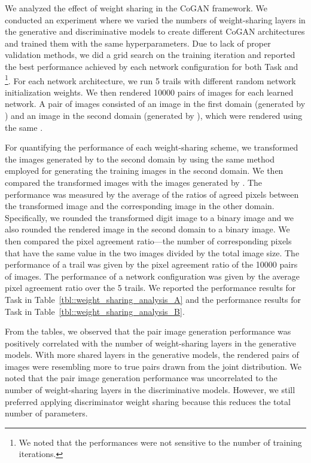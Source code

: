 \documentclass{article}
\begin{document}
We analyzed the effect of weight sharing in the CoGAN framework. We conducted an experiment where we varied the numbers of weight-sharing layers in the generative and discriminative models to create different CoGAN architectures and trained them with the same hyperparameters. Due to lack of proper validation methods, we did a grid search on the training iteration and reported the best performance achieved by each network configuration for both Task  and \footnote{We noted that the performances were not sensitive to the number of training iterations.}. For each network architecture, we run 5 trails with different random network initialization weights. We then rendered 10000 pairs of images for each learned network. A pair of images consisted of an image in the first domain (generated by ) and an image in the second domain (generated by ), which were rendered using the same . 

For quantifying the performance of each weight-sharing scheme, we transformed the images generated by  to the second domain by using the same method employed for generating the training images in the second domain. We then compared the transformed images with the images generated by . The performance was measured by the average of the ratios of agreed pixels between the transformed image and the corresponding image in the other domain. Specifically, we rounded the transformed digit image to a binary image and we also rounded the rendered image in the second domain to a binary image. We then compared the pixel agreement ratio---the number of corresponding pixels that have the same value in the two images divided by the total image size. The performance of a trail was given by the pixel agreement ratio of the 10000 pairs of images. The performance of a network configuration was given by the average pixel agreement ratio over the 5 trails. We reported the performance results for Task  in Table~\ref{tbl::weight_sharing_analysis_A} and the performance results for Task  in Table~\ref{tbl::weight_sharing_analysis_B}.

From the tables, we observed that the pair image generation performance was positively correlated with the number of weight-sharing layers in the generative models. With more shared layers in the generative models, the rendered pairs of images were resembling more to true pairs drawn from the joint distribution. We noted that the pair image generation performance was uncorrelated to the number of weight-sharing layers in the discriminative models. However, we still preferred applying discriminator weight sharing because this reduces the total number of parameters. 
\end{document}
